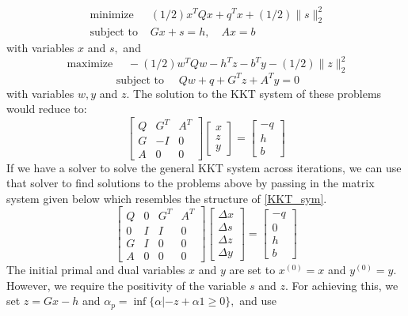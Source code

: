 $$
\begin{array}{ll}
\text { minimize } & (1 / 2) x^{T} Q x+q^{T} x+(1 / 2)\|s\|_{2}^{2} \\
\text { subject to } & G x+s=h, \quad A x=b
\end{array}
$$
with variables $x$ and $s,$ and
$$
\text { maximize } \quad-(1 / 2) w^{T} Q w-h^{T} z-b^{T} y-(1 / 2)\|z\|_{2}^{2}
$$
$$
\text { subject to } \quad Q w+q+G^{T} z+A^{T} y=0
$$
with variables $w, y$ and $z .$ The solution to the KKT system of these problems would reduce to:
$$
\left[\begin{array}{ccc}
Q & G^{T} & A^{T} \\
G & -I & 0 \\
A & 0 & 0
\end{array}\right]\left[\begin{array}{l}
x \\
z \\
y
\end{array}\right]=\left[\begin{array}{c}
-q \\
h \\
b
\end{array}\right]
$$
If we have a solver to solve the general KKT system across iterations, we can use that solver 
to find solutions to the problems above by passing in the matrix system given below which resembles the structure of \ref{KKT_sym}.
\begin{equation} \label{KKT_sym}
\left[\begin{array}{cccc}Q & 0 & G^{T} & A^{T} \\ 0 & I & I & 0\\  G & I & 0 & 0 \\ A & 0 & 0 & 0\end{array}\right]\left[\begin{array}{c}\Delta x \\ \Delta s \\ \Delta z \\ \Delta y\end{array}\right]=\left[\begin{array}{c}-q \\ 0 \\ h \\ b\end{array}\right]
\end{equation}
The initial primal and dual variables $x$ and $y$ are set to $x^{(0)}=x$ and $y^{(0)}=y .$ 
However, we require the positivity of the variable $s$ and $z$. For achieving this, we set $z=G x-h$ and $\alpha_{p}=\inf \{\alpha |-z+\alpha 1 \geq 0\},$ and use
